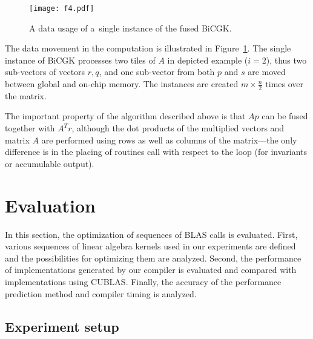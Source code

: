 \documentclass[final]{siamltex}
\begin{document}
{\begin{figure}[h]
\centering
\texttt{[image: f4.pdf]}
\caption{A data usage of a~single instance of the fused BiCGK.}
\label{fig:gemv-ilustration}
\end{figure}

The data movement in the computation is illustrated in Figure~\ref{fig:gemv-ilustration}. The single instance of BiCGK processes two tiles of $A$ in depicted example ($i=2$), thus two sub-vectors of vectors $r, q$, and one sub-vector from both $p$ and $s$ are moved between global and on-chip memory. The instances are created $m \times \frac{n}{2}$ times over the matrix.

The important property of the algorithm described above is that $Ap$ can be fused together with $A^Tr$, although the dot products of the multiplied vectors and matrix $A$ are performed using rows as well as columns of the matrix---the only difference is in the placing of routines call with respect to the loop (for invariants or accumulable output).


















\section{Evaluation}
\label{sect:eval}

In this section, the optimization of sequences of BLAS calls is evaluated. First, various sequences of linear algebra kernels used in our experiments are defined and the possibilities for optimizing them are analyzed. Second, the performance of implementations generated by our compiler is evaluated and compared with implementations using CUBLAS. Finally, the accuracy of the performance prediction method and compiler timing is analyzed.

\subsection{Experiment setup}


}
\end{document}
